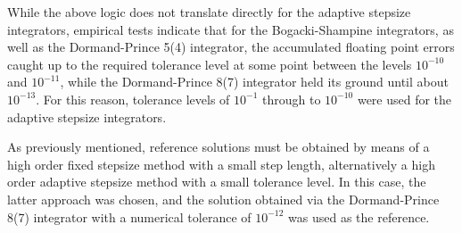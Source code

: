 While the above logic does not translate directly for the adaptive stepsize
integrators, empirical tests indicate that for the Bogacki-Shampine integrators,
as well as the Dormand-Prince 5(4) integrator, the accumulated floating point
errors caught up to the required tolerance level at some point between the
levels $10^{-10}$ and $10^{-11}$, while the Dormand-Prince 8(7) integrator held
its ground until about $10^{-13}$. For this reason, tolerance levels of
$10^{-1}$ through to $10^{-10}$ were used for the adaptive stepsize integrators.

As previously mentioned, reference solutions must be obtained by means of a
high order fixed stepsize method with a small step length, alternatively a high
order adaptive stepsize method with a small tolerance level. In this case, the
latter approach was chosen, and the solution obtained via the Dormand-Prince
8(7) integrator with a numerical tolerance of $10^{-12}$ was used as the
reference.


